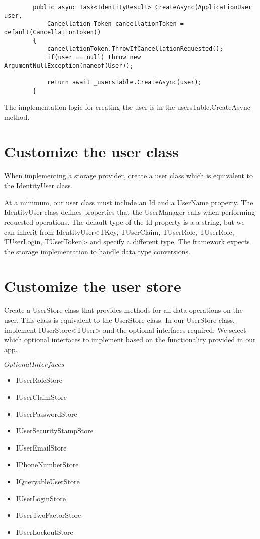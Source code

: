\documentclass{report}
\begin{document}
    \lstset{style=sharpc}
    \begin{lstlisting}
        public async Task<IdentityResult> CreateAsync(ApplicationUser user,
            Cancellation Token cancellationToken = default(CancellationToken))
        {
            cancellationToken.ThrowIfCancellationRequested();
            if(user == null) throw new ArgumentNullException(nameof(User));

            return await _usersTable.CreateAsync(user);
        }
    \end{lstlisting}

    The implementation logic for creating the user is in the
    usersTable.CreateAsync method.

    \section{Customize the user class}
    When implementing a storage provider, create a user class which is equivalent
    to the IdentityUser class.

    At a minimum, our user class must include an Id and a UserName property.
    The IdentityUser class defines properties that the UserManager calls when
    performing requested operations. The default type of the Id property is a
    a string, but we can inherit from IdentityUser<TKey, TUserClaim, TUserRole,
    TUserRole, TUserLogin, TUserToken> and specify a different type. The framework
    expects the storage implementation to handle data type conversions.

    \section{Customize the user store}
    Create a UserStore class that provides methods for all data operations on
    the user. This class is equivalent to the UserStore class. In our UserStore
    class, implement IUserStore<TUser> and the optional interfaces required. We
    select which optional interfaces to implement based on the functionality
    provided in our app.

    ${Optional Interfaces}$
    \begin{itemize}
        \item IUserRoleStore
        \item IUserClaimStore
        \item IUserPasswordStore
        \item IUserSecurityStampStore
        \item IUserEmailStore
        \item IPhoneNumberStore
        \item IQueryableUserStore
        \item IUserLoginStore
        \item IUserTwoFactorStore
        \item IUserLockoutStore
    \end{itemize}
\end{document}
